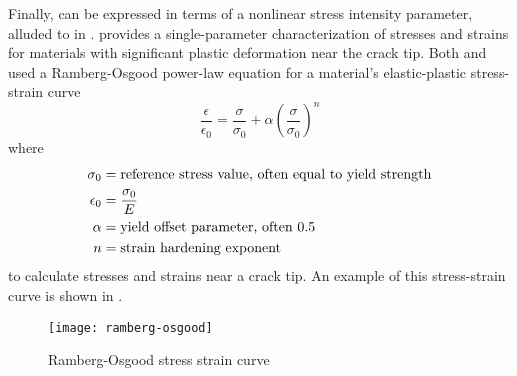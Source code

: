 Finally, \J can be expressed in terms of a nonlinear stress intensity parameter, alluded to in .
\J provides a single-parameter characterization of stresses and strains for materials with significant plastic deformation near the crack tip.
Both \citet{hutchinson1968} and \citet{ricerosengren1968} used a Ramberg-Osgood power-law equation for a material's elastic-plastic stress-strain curve
\begin{equation}
\frac{\epsilon}{\epsilon_0} = \frac{\sigma}{\sigma_0} + \alpha \left( \frac{\sigma}{\sigma_0} \right)^{n}
\end{equation}
where
\begin{align*}
\sigma_0 &= \textnormal{reference stress value, often equal to yield strength} \\
\epsilon_0 &= \frac{\sigma_0}{E} \\
\alpha &= \textnormal{yield offset parameter, often 0.5} \\
n &= \textnormal{strain hardening exponent}
\end{align*}%
%
%
%
to calculate stresses and strains near a crack tip.
An example of this stress-strain curve is shown in .
\begin{figure}[tbp]
\centering
\texttt{[image: ramberg-osgood]}
\caption{\label{fig:ramberg-osgood} Ramberg-Osgood stress strain curve}
\end{figure}
